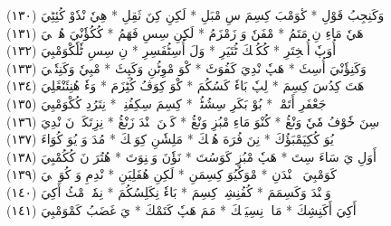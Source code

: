 \documentclass[a4paper, 10pt]{report}
\begin{document}
\begin{center}
\textarabic{(١٣٠) \textcolor{mygreen}{وَكَنِجِبُ قَوْلِ  * كٔوَمْبَ كِسِمَ سِ مْبَلِ  * لَكِنِ كِنَ ثَقِلِ  * هِيٗ نْدٗوْ كُئِٹِيَ }} 
\\[5mm] 

\textarabic{(١٣١) \textcolor{mygreen}{هَيٗ مَاءِ نِ مَتَمُ  * مْفَنٗ وَ زَمْزَمُ  * لَكِنِ سِسِ فَهَمُ  * كُكُؤٗنْيَ هُچٖلٖيَ }} 
\\[5mm] 

\textarabic{(١٣٢) \textcolor{mygreen}{أُوَپٗ أُمٖخِتَرِ  * كُكُپٖكَ ٹُتَيَرِ  * وَلَ أُسِٹُفَسِرِ  * نِ سِسِ ٹٗلٗكْوَمْبِيَ }} 
\\[5mm] 

\textarabic{(١٣٣) \textcolor{mygreen}{وَكَنِؤٗنْيَ أُسِٹَ  * هَپٗ نْدِيَ كَفُوَٹَ  * كْوَ مْوِٹُنِ وَكَپِٹَ  * مْبِيٗ وَكَنِتٗلٖيَ }} 
\\[5mm] 

\textarabic{(١٣٤) \textcolor{mygreen}{هَتَ كِدُسَ كِسِمَ  * لِپٗ بَاءٗ كَسُكُمَ  * كْوَ كِوَڤُ كُٹِزَمَ  * وَءٗ هُنِئَنْڠَلِيَ }} 
\\[5mm] 

\textarabic{(١٣٥) \textcolor{mygreen}{جَعْفَرِ أَتَمْكٖ  * بُوْ بَكَرِ سِشُٹُكٖ  * كِسِمَ سِكِفُنِكٖ  * نِتَرُدِ كُكْوَمْبِيَ }} 
\\[5mm] 

\textarabic{(١٣٦) \textcolor{mygreen}{سِنَ خٗوْفُ مٗيٗ وَنْڠُ  * كُنْوَ مَاءِ مْبُزِ وَنْڠُ  * كَنٖنَ نٖنْدَ زَنْڠُ  * نِزِتَكَسٖ نَ نْدِيَ }} 
\\[5mm] 

\textarabic{(١٣٧) \textcolor{mygreen}{يُوَ كُكِپَمْبَؤُكَ  * نِنَ فُرَهَ هُتٖكَ  * مَلِشٗنِ كِوَپٖكَ  * مُدَ وَ يُوَ كُوَاءَ }} 
\\[5mm] 

\textarabic{(١٣٨) \textcolor{mygreen}{أَوَلِ يَ سَاءَ سِتَ  * هَپٗ مْبُزِ كَوَسُتَ  * نَؤٗنَ وَمٖنِوَتَ  * هُتُرَ نَ كُكُمْبِيَ }} 
\\[5mm] 

\textarabic{(١٣٩) \textcolor{mygreen}{كَوَمْبِيَ إٖنٖنْدَنِ  * مْوَكُيُوَ كِسِمَنِ  * لَكِنِ هُفَلِيَنِ  * نْدِمِ وَ كُوَٹٖكٖيَ }} 
\\[5mm] 

\textarabic{(١٤٠) \textcolor{mygreen}{وَكٖنْدَ وَكَسِمَمَ  * كُفُنِشِوٖ كِسِمَ  * بَاءٗ نِكَلِسُكُمَ  * نِمٗنٖ مْٹُ أَكِيَ }} 
\\[5mm] 

\textarabic{(١٤١) \textcolor{mygreen}{أَكِيَ أَكَنِشِكَ  * مَاءٖ نِسِيَٹٖكَ  * مَمَ هَپٗ كَتَمْكَ  * يَ غَضَبُ كَمْوَمْبِيَ }} 
\\[5mm] 


\end{center}
\end{document}
